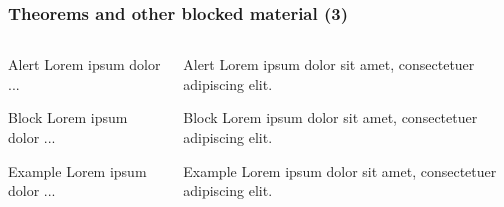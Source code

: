 \documentclass[aspectratio=1610]{beamer}
\begin{document}
\begin{frame}[fragile]
  \frametitle{Theorems and other blocked material (3)}
  \begin{columns}[onlytextwidth]
    \begin{column}{0.45\textwidth}
\begin{CodeBox}{}
\begin{alertblock}{Alert}
  Lorem ipsum dolor ...
\end{alertblock}
\end{CodeBox}

\begin{CodeBox}{}
\begin{block}{Block}
  Lorem ipsum dolor ...
\end{block}
\end{CodeBox}

\begin{CodeBox}{}
\begin{exampleblock}{Example}
  Lorem ipsum dolor ...
\end{exampleblock}
\end{CodeBox}
\end{column}\textwidth%
\begin{column}{0.5\textwidth}
  \begin{alertblock}{Alert}
    Lorem ipsum dolor sit amet, consectetuer adipiscing elit.
  \end{alertblock}
  \begin{block}{Block}
    Lorem ipsum dolor sit amet, consectetuer adipiscing elit.
  \end{block}
  \begin{exampleblock}{Example}
    Lorem ipsum dolor sit amet, consectetuer adipiscing elit.
  \end{exampleblock}
\end{column}
\end{columns}
\end{frame}
\end{document}
